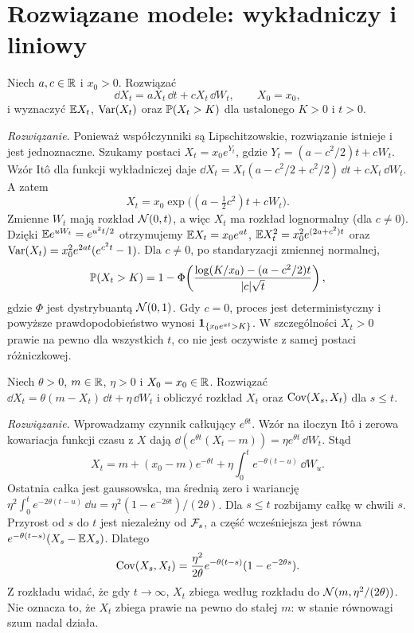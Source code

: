 \section{Rozwiązane modele: wykładniczy i liniowy}
\begin{zadanie}
\label{zad:gbm}
Niech $a,c\in\mathbb{R}$ i $x_0>0$. Rozwiązać
\[
\dd X_t=aX_t\,\dd t+cX_t\,\dd W_t,
\qquad X_0=x_0,
\]
i wyznaczyć $\mathbb{E} X_t$, $\operatorname{Var}(X_t)$ oraz
$\mathbb{P}(X_t>K)$ dla ustalonego $K>0$ i $t>0$.

\emph{Rozwiązanie.} Ponieważ współczynniki są
Lipschitzowskie, rozwiązanie istnieje i jest jednoznaczne.
Szukamy postaci $X_t=x_0e^{Y_t}$, gdzie
$Y_t=(a-c^2/2)t+cW_t$. Wzór Itô dla funkcji
wykładniczej daje
$\dd X_t=X_t(a-c^2/2+c^2/2)\,\dd t+cX_t\,\dd W_t$.
A zatem
\[
X_t=x_0\exp\bigl((a-\tfrac12c^2)t+cW_t\bigr).
\tag{5.7}\label{eq:gbm-solution}
\]
Zmienne $W_t$ mają rozkład $\mathcal{N}(0,t)$, a więc
$X_t$ ma rozkład lognormalny (dla $c\ne0$).
Dzięki $\mathbb{E} e^{uW_t}=e^{u^2t/2}$ otrzymujemy
$\mathbb{E} X_t=x_0e^{at}$,
$\mathbb{E} X_t^2=x_0^2e^{(2a+c^2)t}$ oraz
$\operatorname{Var}(X_t)=x_0^2e^{2at}(e^{c^2t}-1)$.
Dla $c\ne0$, po standaryzacji zmiennej normalnej,
\[
\mathbb{P}(X_t>K)=1-\Phi\!\left(
\frac{\log(K/x_0)-(a-c^2/2)t}{|c|\sqrt t}\right),
\]
gdzie $\Phi$ jest dystrybuantą $\mathcal{N}(0,1)$.
Gdy $c=0$, proces jest deterministyczny i powyższe
prawdopodobieństwo wynosi $\mathbf{1}_{\{x_0e^{at}>K\}}$.
W szczególności $X_t>0$ prawie na pewno dla wszystkich $t$,
co nie jest oczywiste z samej postaci różniczkowej.
\end{zadanie}

\begin{zadanie}
\label{zad:ou}
Niech $\theta>0$, $m\in\mathbb{R}$, $\eta>0$ i
$X_0=x_0\in\mathbb{R}$. Rozwiązać
$\dd X_t=\theta(m-X_t)\,\dd t+\eta\,\dd W_t$
i obliczyć rozkład $X_t$ oraz $\operatorname{Cov}(X_s,X_t)$ dla $s\le t$.

\emph{Rozwiązanie.} Wprowadzamy czynnik całkujący
$e^{\theta t}$. Wzór na iloczyn Itô i zerowa
kowariacja funkcji czasu z $X$ dają
$\dd(e^{\theta t}(X_t-m))=\eta e^{\theta t}\,\dd W_t$.
Stąd
\[
X_t=m+(x_0-m)e^{-\theta t}
+\eta\int_0^t e^{-\theta(t-u)}\,\dd W_u.
\tag{5.8}\label{eq:ou-solution}
\]
Ostatnia całka jest gaussowska, ma średnią zero
i wariancję $\eta^2\int_0^t e^{-2\theta(t-u)}\,\dd u
=\eta^2(1-e^{-2\theta t})/(2\theta)$.
Dla $s\le t$ rozbijamy całkę w chwili $s$.
Przyrost od $s$ do $t$ jest niezależny od $\mathcal{F}_s$,
a część wcześniejsza jest równa
$e^{-\theta(t-s)}(X_s-\mathbb{E} X_s)$. Dlatego
\[
\operatorname{Cov}(X_s,X_t)=\frac{\eta^2}{2\theta}
 e^{-\theta(t-s)}(1-e^{-2\theta s}).
\]
Z rozkładu widać, że gdy $t\to\infty$,
$X_t$ zbiega według rozkładu do
$\mathcal{N}(m,\eta^2/(2\theta))$.
Nie oznacza to, że $X_t$ zbiega prawie na pewno
do stałej $m$: w stanie równowagi szum nadal działa.
\end{zadanie}

